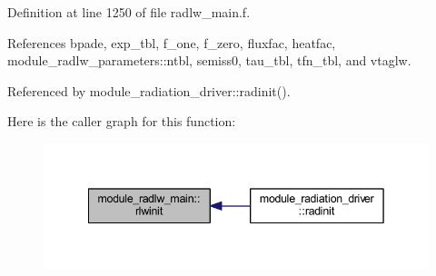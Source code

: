 Definition at line 1250 of file radlw\+\_\+main.\+f.



References bpade, exp\+\_\+tbl, f\+\_\+one, f\+\_\+zero, fluxfac, heatfac, module\+\_\+radlw\+\_\+parameters\+::ntbl, semiss0, tau\+\_\+tbl, tfn\+\_\+tbl, and vtaglw.



Referenced by module\+\_\+radiation\+\_\+driver\+::radinit().



Here is the caller graph for this function\+:
\nopagebreak
\begin{figure}[H]
\begin{center}
\leavevmode
\includegraphics[width=342pt]{group__module__radlw__main_ga916dc850de8c1d18ff9bfd6f63b65d30_icgraph}
\end{center}
\end{figure}


